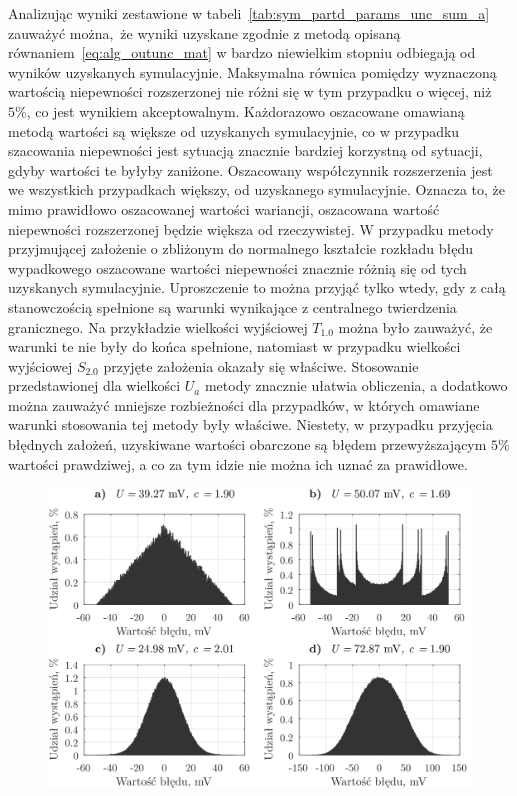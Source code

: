Analizując wyniki zestawione w tabeli~\ref{tab:sym_partd_params_unc_sum_a} zauważyć można, że wyniki uzyskane zgodnie z metodą opisaną równaniem~\eqref{eq:alg_outunc_mat} w bardzo niewielkim stopniu odbiegają od wyników uzyskanych symulacyjnie. Maksymalna równica pomiędzy wyznaczoną wartością niepewności rozszerzonej nie różni się w tym przypadku o więcej, niż $5\%$, co jest wynikiem akceptowalnym. Każdorazowo oszacowane omawianą metodą wartości są większe od uzyskanych symulacyjnie, co w przypadku szacowania niepewności jest sytuacją znacznie bardziej korzystną od sytuacji, gdyby wartości te byłyby zaniżone. Oszacowany współczynnik rozszerzenia jest we wszystkich przypadkach większy, od uzyskanego symulacyjnie. Oznacza to, że mimo prawidłowo oszacowanej wartości wariancji, oszacowana wartość niepewności rozszerzonej będzie większa od rzeczywistej. W przypadku metody przyjmującej założenie o zbliżonym do normalnego kształcie rozkładu błędu wypadkowego oszacowane wartości niepewności znacznie różnią się od tych uzyskanych symulacyjnie. Uproszczenie to można przyjąć tylko wtedy, gdy z całą stanowczością spełnione są warunki wynikające z centralnego twierdzenia granicznego. Na przykładzie wielkości wyjściowej $T_{1.0}$ można było zauważyć, że warunki te nie były do końca spełnione, natomiast w przypadku wielkości wyjściowej $S_{2.0}$ przyjęte założenia okazały się właściwe. Stosowanie przedstawionej dla wielkości $U_{a}$ metody znacznie ułatwia obliczenia, a dodatkowo można zauważyć mniejsze rozbieżności dla przypadków, w których omawiane warunki stosowania tej metody były właściwe. Niestety, w przypadku przyjęcia błędnych założeń, uzyskiwane wartości obarczone są błędem przewyższającym $5\%$ wartości prawdziwej, a co za tym idzie nie można ich uznać za prawidłowe.

\begin{figure}[htb!]
\begin{center}
\includegraphics{obrazki/hist_part_S}
\end{center}
\end{figure}

